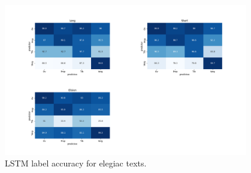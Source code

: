 \begin{figure}[H]
    \centering
    \includegraphics[width=0.95\textwidth]{img/lstm/lstm_label_accuracy_elegiac.png}

    \caption{LSTM label accuracy for elegiac texts.}
    \label{fig:exp_architecture}
\end{figure}


